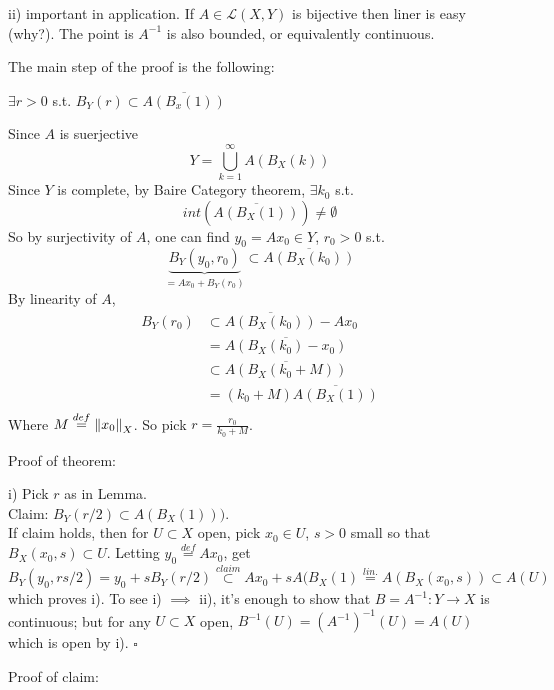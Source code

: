 \begin{remark}\nl
	ii) important in application. If $A\in\mathcal{L}(X,Y)$ is bijective then  liner is easy (why?). The point is $A^{-1}$ is also bounded, or equivalently continuous.
\end{remark}

The main step of the proof is the following:
\begin{lemma}[$A$ as in i)]\nl
	$\exists r>0$ s.t. $B_Y(r)\subset \overline{A(B_x(1))}$
	\begin{pf}{}{}\rm
		Since $A$ is suerjective
		$$
			Y=\bigcup_{k=1}^\infty A(B_X(k))
		$$
		Since $Y$ is complete, by  Baire Category theorem, $\exists k_0$ s.t.
		$$ int(\overline{A(B_X(1))})\neq\emptyset$$
		So by surjectivity of $A$, one can find $y_0=Ax_0\in Y$, $r_0>0$ s.t.
		$$ \underbrace{B_Y(y_0,r_0)}_{=Ax_0+B_Y(r_0)}\subset \overline{A(B_X(k_0))}$$
		By linearity of $A$,
		\begin{equation}\nonumber
			\begin{split}
				B_Y(r_0)&\subset\overline{A(B_X(k_0))}-Ax_0 \\ &=\overline{A(B_X(k_0)-x_0)}\\
				&\subset \overline{A(B_X(k_0+M))}   \\
				&=(k_0+M)\overline{A(B_X(1))}\\
			\end{split}
		\end{equation}
		Where $M\stackrel{def}{=}\left\|{x_0}\right\|_X$. So pick $r=\frac{r_0}{k_0+M}$.
	\end{pf}

\end{lemma}
Proof of theorem:
\begin{pf}{}{}
	i) Pick $r$ as in Lemma.\\
	Claim: $B_Y(r/2)\subset A(B_X(1)))$.\\
	If claim holds, then for $U\subset X$ open, pick $x_0\in U$, $s>0$ small so that $B_X(x_0,s)\subset U$. Letting $y_0\stackrel{def}{=}Ax_0$, get
	$$
		B_Y(y_0,rs/2)=y_0+sB_Y(r/2)\stackrel{claim}{\subset}Ax_0+sA(B_X(1)\stackrel{lin.}{=}A(B_X(x_0,s))\subset A(U)
	$$
	which proves i). To see i) $\implies$ ii), it's enough to show that $B=A^{-1}:Y\to X$ is continuous; but for any $U\subset X$ open, $B^{-1}(U)=(A^{-1})^{-1}(U)=A(U)$
	which is open by i). $\square$
\end{pf}
Proof of claim:
